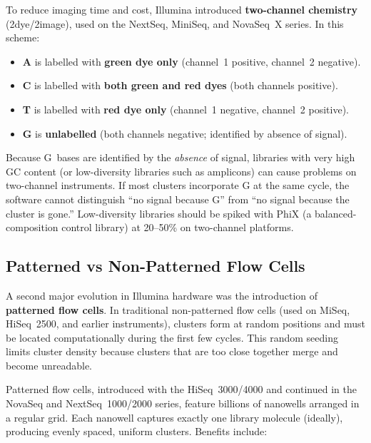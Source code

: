 To reduce imaging time and cost, Illumina introduced \textbf{two-channel chemistry} (2dye/2image), used on the NextSeq, MiniSeq, and NovaSeq~X series. In this scheme:

\begin{itemize}[nosep]
  \item \textbf{A} is labelled with \textbf{green dye only} (channel~1 positive, channel~2 negative).
  \item \textbf{C} is labelled with \textbf{both green and red dyes} (both channels positive).
  \item \textbf{T} is labelled with \textbf{red dye only} (channel~1 negative, channel~2 positive).
  \item \textbf{G} is \textbf{unlabelled} (both channels negative; identified by absence of signal).
\end{itemize}

\begin{warningbox}[title={G-Base Calling in Two-Channel Chemistry}]
Because G~bases are identified by the \emph{absence} of signal, libraries with very high GC content (or low-diversity libraries such as amplicons) can cause problems on two-channel instruments. If most clusters incorporate G at the same cycle, the software cannot distinguish ``no signal because G'' from ``no signal because the cluster is gone.'' Low-diversity libraries should be spiked with PhiX (a balanced-composition control library) at 20--50\% on two-channel platforms.
\end{warningbox}

\subsection{Patterned vs Non-Patterned Flow Cells}
\label{sec:patterned}

A second major evolution in Illumina hardware was the introduction of \textbf{patterned flow cells}. In traditional non-patterned flow cells (used on MiSeq, HiSeq~2500, and earlier instruments), clusters form at random positions and must be located computationally during the first few cycles. This random seeding limits cluster density because clusters that are too close together merge and become unreadable.

Patterned flow cells, introduced with the HiSeq~3000/4000 and continued in the NovaSeq and NextSeq~1000/2000 series, feature billions of nanowells arranged in a regular grid. Each nanowell captures exactly one library molecule (ideally), producing evenly spaced, uniform clusters. Benefits include:

